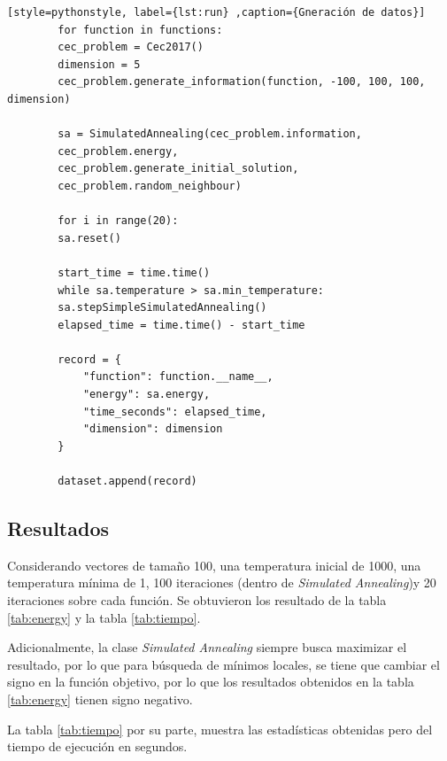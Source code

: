 \documentclass[12pt,twoside]{article}
\begin{document}
	\begin{lstlisting}[style=pythonstyle, label={lst:run} ,caption={Gneración de datos}]
		for function in functions:
		cec_problem = Cec2017()
		dimension = 5
		cec_problem.generate_information(function, -100, 100, 100, dimension)
		
		sa = SimulatedAnnealing(cec_problem.information, 
		cec_problem.energy, 
		cec_problem.generate_initial_solution, 
		cec_problem.random_neighbour)
		
		for i in range(20):
		sa.reset()
		
		start_time = time.time()
		while sa.temperature > sa.min_temperature:
		sa.stepSimpleSimulatedAnnealing()
		elapsed_time = time.time() - start_time
		
		record = {
			"function": function.__name__,
			"energy": sa.energy,
			"time_seconds": elapsed_time,
			"dimension": dimension
		}
		
		dataset.append(record)
	\end{lstlisting}
	
	\subsection{Resultados}
	
	Considerando vectores de tamaño 100, una temperatura inicial de 1000, una temperatura mínima de 1,  100 iteraciones (dentro de \textit{Simulated Annealing})y   20 iteraciones sobre cada función. Se obtuvieron los resultado de la tabla \ref{tab:energy} y la tabla \ref{tab:tiempo}.
	
	Adicionalmente,  la clase \textit{Simulated Annealing} siempre busca maximizar el resultado, por lo que para búsqueda de mínimos locales, se tiene que cambiar el signo en la función objetivo, por lo que los resultados obtenidos en la tabla \ref{tab:energy} tienen signo negativo.
	
	La tabla \ref{tab:tiempo} por su parte, muestra las estadísticas obtenidas pero del tiempo de ejecución en segundos. 
	
\end{document}
